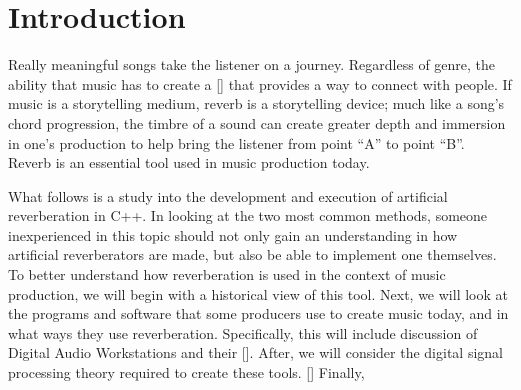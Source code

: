 \chapter{Introduction}\label{intro}
\hspace*{-0.155cm}Really meaningful songs take the listener on a journey. Regardless of genre, the ability that music has to create a [] that provides a way to connect with people. If music is a storytelling medium, reverb is a storytelling device; much like a song's chord progression, the timbre of a sound can create greater depth and immersion in one's production to help bring the listener from point ``A'' to point ``B''. Reverb is an essential tool used in music production today.

What follows is a study into the development and execution of artificial reverberation in C++. In looking at the two most common methods, someone inexperienced in this topic should not only gain an understanding in how artificial reverberators are made, but also be able to implement one themselves. To better understand how reverberation is used in the context of music production, we will begin with a historical view of this tool. Next, we will look at the programs and software that some producers use to create music today, and in what ways they use reverberation. Specifically, this will include discussion of Digital Audio Workstations and their []. After, we will consider the digital signal processing theory required to create these tools. [] Finally,
